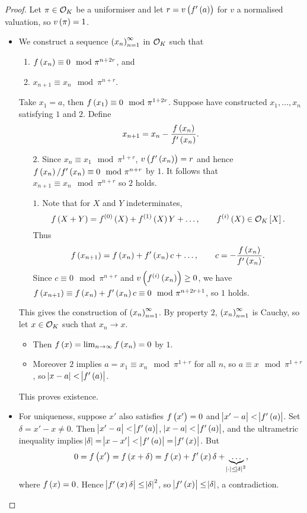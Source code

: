 \begin{proof}
Let $ \pi \in \mathcal{O}_K $ be a uniformiser and let $ r = v\br{f'\br{a}} $ for $ v $ a normalised valuation, so $ v\br{\pi} = 1 $.
\begin{itemize}
\item We construct a sequence $ \br{x_n}_{n = 1}^\infty $ in $ \mathcal{O}_K $ such that
\begin{enumerate}
\item $ f\br{x_n} \equiv 0 \mod \pi^{n + 2r} $, and
\item $ x_{n + 1} \equiv x_n \mod \pi^{n + r} $.
\end{enumerate}
Take $ x_1 = a $, then $ f\br{x_1} \equiv 0 \mod \pi^{1 + 2r} $. Suppose have constructed $ x_1, \dots, x_n $ satisfying $ 1 $ and $ 2 $. Define
$$ x_{n + 1} = x_n - \dfrac{f\br{x_n}}{f'\br{x_n}}. $$
\begin{itemize}
\item[$ 2 $.] Since $ x_n \equiv x_1 \mod \pi^{1 + r} $, $ v\br{f'\br{x_n}} = r $ and hence $ f\br{x_n} / f'\br{x_n} \equiv 0 \mod \pi^{n + r} $ by $ 1 $. It follows that $ x_{n + 1} \equiv x_n \mod \pi^{n + r} $ so $ 2 $ holds.
\item[$ 1 $.] Note that for $ X $ and $ Y $ indeterminates,
$$ f\br{X + Y} = f^{\br{0}}\br{X} + f^{\br{1}}\br{X}Y + \dots, \qquad f^{\br{i}}\br{X} \in \OOO_K\sbr{X}. $$
Thus
$$ f\br{x_{n + 1}} = f\br{x_n} + f'\br{x_n}c + \dots, \qquad c = -\dfrac{f\br{x_n}}{f'\br{x_n}}. $$
Since $ c \equiv 0 \mod \pi^{n + r} $ and $ v\br{f^{\br{i}}\br{x_n}} \ge 0 $, we have $ f\br{x_{n + 1}} \equiv f\br{x_n} + f'\br{x_n}c \equiv 0 \mod \pi^{n + 2r + 1} $, so $ 1 $ holds.
\end{itemize}
This gives the construction of $ \br{x_n}_{n = 1}^\infty $. By property $ 2 $, $ \br{x_n}_{n = 1}^\infty $ is Cauchy, so let $ x \in \mathcal{O}_K $ such that $ x_n \to x $.
\begin{itemize}
\item Then $ f\br{x} = \lim_{n \to \infty} f\br{x_n} = 0 $ by $ 1 $.
\item Moreover $ 2 $ implies $ a = x_1 \equiv x_n \mod \pi^{1 + r} $ for all $ n $, so $ a \equiv x \mod \pi^{1 + r} $, so $ \abs{x - a} < \abs{f'\br{a}} $.
\end{itemize}
This proves existence.
\item For uniqueness, suppose $ x' $ also satisfies $ f\br{x'} = 0 $ and $ \abs{x' - a} < \abs{f'\br{a}} $. Set $ \delta = x' - x \ne 0 $. Then $ \abs{x' - a} < \abs{f'\br{a}} $, $ \abs{x - a} < \abs{f'\br{a}} $, and the ultrametric inequality implies $ \abs{\delta} = \abs{x - x'} < \abs{f'\br{a}} = \abs{f'\br{x}} $. But
$$ 0 = f\br{x'} = f\br{x + \delta} = f\br{x} + f'\br{x}\delta + \underbrace{\dots}_{\abs{\cdot} \le \abs{\delta}^2}, $$
where $ f\br{x} = 0 $. Hence $ \abs{f'\br{x}\delta} \le \abs{\delta}^2 $, so $ \abs{f'\br{x}} \le \abs{\delta} $, a contradiction.
\end{itemize}
\end{proof}

